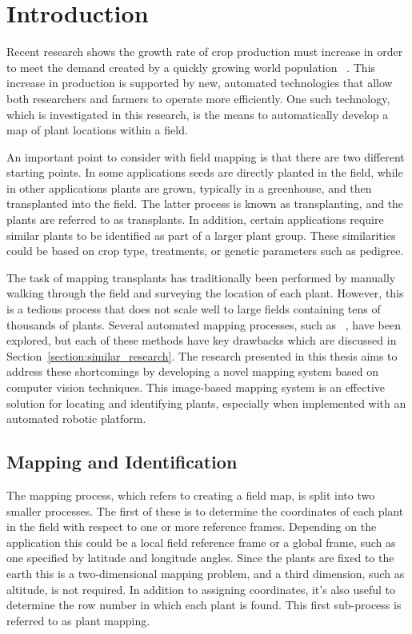 
\cleardoublepage

\chapter{Introduction}
\label{introduction}

Recent research shows the growth rate of crop production must increase in order to meet the demand created by a quickly growing world population ~\citep{tester:2010}.  This increase in production is supported by new, automated technologies that allow both researchers and farmers to operate more efficiently. One such technology, which is investigated in this research, is the means to automatically develop a map of plant locations within a field. 
 
An important point to consider with field mapping is that there are two different starting points.  In some applications seeds are directly planted in the field, while in other applications plants are grown, typically in a greenhouse, and then transplanted into the field.  The latter process is known as transplanting, and the plants are referred to as transplants.  In addition, certain applications require similar plants to be identified as part of a larger plant group.  These similarities could be based on crop type, treatments, or genetic parameters such as pedigree. 

The task of mapping transplants has traditionally been performed by manually walking through the field and surveying the location of each plant. However, this is a tedious process that does not scale well to large fields containing tens of thousands of plants.  Several automated mapping processes, such as ~\citep{Perez-Ruiz:2012}, have been explored, but each of these methods have key drawbacks which are discussed in Section~\ref{section:similar_research}.  The research presented in this thesis aims to address these shortcomings by developing a novel mapping system based on computer vision techniques.  This image-based mapping system is an effective solution for locating and identifying plants, especially when implemented with an automated robotic platform. 

\section{Mapping and Identification}

The mapping process, which refers to creating a field map, is split into two smaller processes.  The first of these is to determine the coordinates of each plant in the field with respect to one or more reference frames.  Depending on the application this could be a local field reference frame or a global frame, such as one specified by latitude and longitude angles.  Since the plants are fixed to the earth this is a two-dimensional mapping problem, and a third dimension, such as altitude, is not required.  In addition to assigning coordinates, it's also useful to determine the row number in which each plant is found.  This first sub-process is referred to as plant mapping. 


